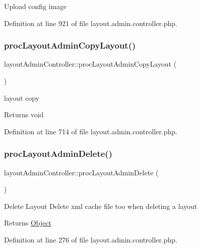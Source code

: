 Upload config image 

Definition at line 921 of file layout.\+admin.\+controller.\+php.

\mbox{\label{classlayoutAdminController_afaf005eb86d8c09e2c610f743dbb1522}} 
\subsubsection{\texorpdfstring{proc\+Layout\+Admin\+Copy\+Layout()}{procLayoutAdminCopyLayout()}}
{\footnotesize\ttfamily layout\+Admin\+Controller\+::proc\+Layout\+Admin\+Copy\+Layout (\begin{DoxyParamCaption}{ }\end{DoxyParamCaption})}

layout copy \begin{DoxyReturn}{Returns}
void 
\end{DoxyReturn}


Definition at line 714 of file layout.\+admin.\+controller.\+php.

\mbox{\label{classlayoutAdminController_a4a394a3902b03d0e7454f3b5047c1d5e}} 
\subsubsection{\texorpdfstring{proc\+Layout\+Admin\+Delete()}{procLayoutAdminDelete()}}
{\footnotesize\ttfamily layout\+Admin\+Controller\+::proc\+Layout\+Admin\+Delete (\begin{DoxyParamCaption}{ }\end{DoxyParamCaption})}

Delete Layout Delete xml cache file too when deleting a layout \begin{DoxyReturn}{Returns}
\hyperlink{classObject}{Object} 
\end{DoxyReturn}


Definition at line 276 of file layout.\+admin.\+controller.\+php.

